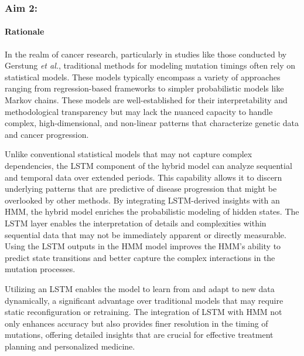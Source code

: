 \subsubsection{Aim 2: \SpecificAimTwo}

\paragraph{Rationale}


In the realm of cancer research, particularly in studies like those conducted by Gerstung \textit{et al.}, 
traditional methods for modeling mutation timings often rely on statistical models.
These models typically encompass a variety of approaches ranging from regression-based 
frameworks to simpler probabilistic models like Markov chains.
These models are well-established for their interpretability and methodological transparency but 
may lack the nuanced capacity to handle complex, high-dimensional, 
and non-linear patterns that characterize genetic data and cancer progression. %

Unlike conventional statistical models that may not capture complex dependencies, 
the LSTM component of the hybrid model can analyze sequential and temporal data over extended periods. 
This capability allows it to discern underlying patterns that are predictive of 
disease progression that might be overlooked by other methods.
By integrating LSTM-derived insights with an HMM, 
the hybrid model enriches the probabilistic modeling of hidden states. 
The LSTM layer enables the interpretation of details and complexities within 
sequential data that may not be immediately apparent or directly measurable.
Using the LSTM outputs in the HMM model improves the HMM's ability to predict state transitions 
and better capture the complex interactions in the mutation processes.

Utilizing an LSTM enables the model to learn from and adapt to new data dynamically, 
a significant advantage over traditional models that may require static reconfiguration or retraining. 
The integration of LSTM with HMM not only enhances accuracy but also provides finer resolution in the timing of mutations, 
offering detailed insights that are crucial for effective treatment planning and personalized medicine.

